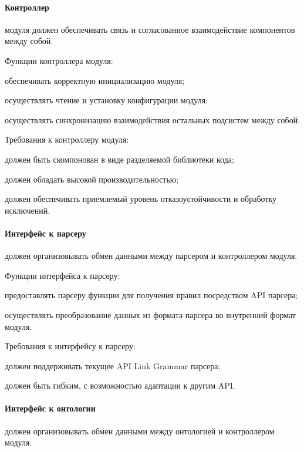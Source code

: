 \paragraph{Контроллер} модуля должен обеспечивать связь и согласованное взаимодействие компонентов между собой.

Функции контроллера модуля:
\begin{list}{}{\leftmargin=1.5cm}
  \item обеспечивать корректную инициализацию модуля;
  \item осуществлять чтение и установку конфигурации модуля;
  \item осуществлять синхронизацию взаимодействия остальных подсистем между собой.
\end{list}

Требования к контроллеру модуля:
\begin{list}{}{\leftmargin=1.5cm}
  \item должен быть скомпонован в виде разделяемой библиотеки кода;
  \item должен обладать высокой производительностью;
  \item должен обеспечивать приемлемый уровень отказоустойчивости и обработку исключений.
\end{list}

\paragraph{Интерфейс к парсеру} должен организовывать обмен данными между парсером и контроллером модуля.

Функции интерфейса к парсеру:
\begin{list}{}{\leftmargin=1.5cm}
  \item предоставлять парсеру функции для получения правил посредством API парсера;
  \item осуществлять преобразование данных из формата парсера во внутренний формат модуля.
\end{list}

Требования к интерфейсу к парсеру:
\begin{list}{}{\leftmargin=1.5cm}
  \item должен поддерживать текущее API Link Grammar парсера;
  \item должен быть гибким, с возможностью адаптации к другим API. 
\end{list}

\paragraph{Интерфейс к онтологии} должен организовывать обмен данными между онтологией и контроллером модуля.

